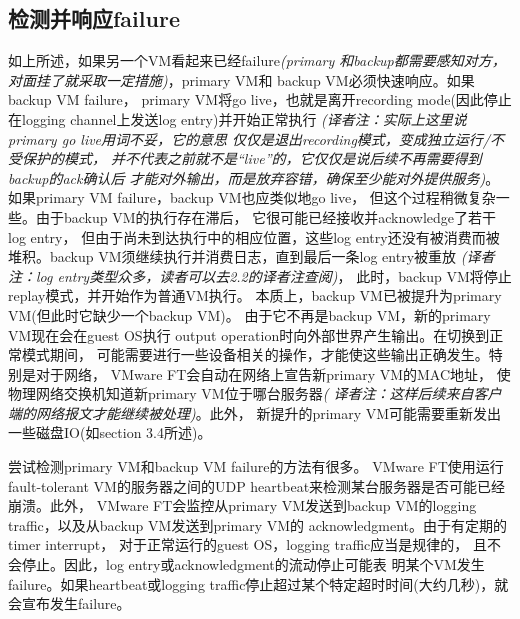 \subsection{检测并响应failure}

如上所述，如果另一个VM看起来已经failure\emph{(primary%
和backup都需要感知对方，对面挂了就采取一定措施)}，primary VM和%
backup VM必须快速响应。如果backup VM failure，%
primary VM将go live，也就是离开recording mode(因此停止%
在logging channel上发送log entry)并开始正常执行%
\emph{(译者注：实际上这里说primary go live用词不妥，它的意思%
仅仅是退出recording模式，变成独立运行/不受保护的模式，%
并不代表之前就不是“live”的，它仅仅是说后续不再需要得到backup的ack确认后%
才能对外输出，而是放弃容错，确保至少能对外提供服务)}。%
如果primary VM failure，backup VM也应类似地go live，%
但这个过程稍微复杂一些。由于backup VM的执行存在滞后，%
它很可能已经接收并acknowledge了若干log entry，%
但由于尚未到达执行中的相应位置，这些log entry还没有被消费而被%
堆积。backup VM须继续执行并消费日志，直到最后一条log entry被重放%
\emph{(译者注：log entry类型众多，读者可以去2.2的译者注查阅)}，%
此时，backup VM将停止replay模式，并开始作为普通VM执行。%
本质上，backup VM已被提升为primary VM(但此时它缺少一个backup VM)。%
由于它不再是backup VM，新的primary VM现在会在guest OS执行%
output operation时向外部世界产生输出。在切换到正常模式期间，%
可能需要进行一些设备相关的操作，才能使这些输出正确发生。特别是对于网络，%
VMware FT会自动在网络上宣告新primary VM的MAC地址，%
使物理网络交换机知道新primary VM位于哪台服务器\emph{(%
译者注：这样后续来自客户端的网络报文才能继续被处理)}。此外，%
新提升的primary VM可能需要重新发出一些磁盘IO(如section 3.4所述)。%

尝试检测primary VM和backup VM failure的方法有很多。%
VMware FT使用运行fault-tolerant VM的服务器之间的UDP %
heartbeat来检测某台服务器是否可能已经崩溃。此外，%
VMware FT会监控从primary VM发送到backup VM的logging %
traffic，以及从backup VM发送到primary VM的%
acknowledgment。由于有定期的timer interrupt，%
对于正常运行的guest OS，logging traffic应当是规律的，%
且不会停止。因此，log entry或acknowledgment的流动停止可能表%
明某个VM发生failure。如果heartbeat或logging %
traffic停止超过某个特定超时时间(大约几秒)，就会宣布发生failure。%


